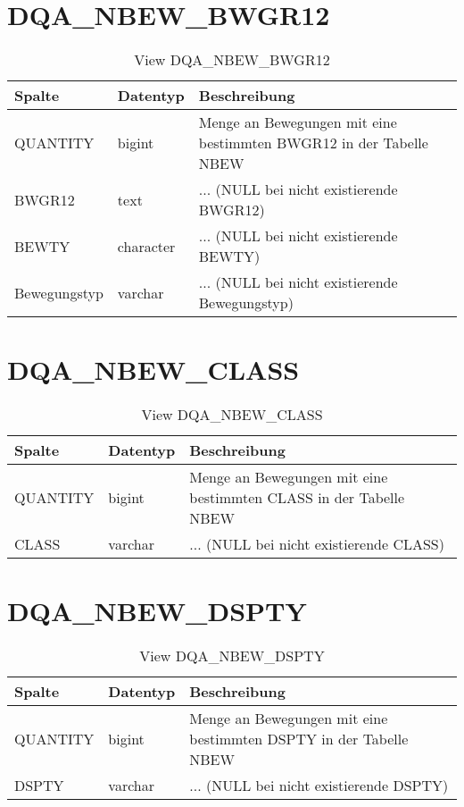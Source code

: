   \section{DQA\_NBEW\_BWGR12}

  \begin{table}[ht]
    \centering
    \caption{View DQA\_NBEW\_BWGR12}
    \label{tab:dqanbewbwgr12}
    \begin{tabular}{||l|l|p{10cm}||}
      \hline
      Spalte & Datentyp & Beschreibung \\ [0.5ex] \hline \hline
QUANTITY & bigint & Menge an Bewegungen mit eine bestimmten BWGR12 in der Tabelle NBEW \\ \hline
BWGR12 & text & ... (NULL bei nicht existierende BWGR12)\\ \hline
BEWTY & character & ... (NULL bei nicht existierende BEWTY)\\ \hline
Bewegungstyp & varchar & ... (NULL bei nicht existierende Bewegungstyp)\\ \hline
    \end{tabular}
  \end{table}
 \clearpage
  \section{DQA\_NBEW\_CLASS}

  \begin{table}[ht]
    \centering
    \caption{View DQA\_NBEW\_CLASS}
    \label{tab:dqanbewclass}
    \begin{tabular}{||l|l|p{10cm}||}
      \hline
      Spalte & Datentyp & Beschreibung \\ [0.5ex] \hline \hline
QUANTITY & bigint & Menge an Bewegungen mit eine bestimmten CLASS in der Tabelle NBEW \\ \hline
CLASS & varchar & ... (NULL bei nicht existierende CLASS)\\ \hline
    \end{tabular}
  \end{table}
 \clearpage
  \section{DQA\_NBEW\_DSPTY}

  \begin{table}[ht]
    \centering
    \caption{View DQA\_NBEW\_DSPTY}
    \label{tab:dqanbewdspty}
    \begin{tabular}{||l|l|p{10cm}||}
      \hline
      Spalte & Datentyp & Beschreibung \\ [0.5ex] \hline \hline
QUANTITY & bigint & Menge an Bewegungen mit eine bestimmten DSPTY in der Tabelle NBEW \\ \hline
DSPTY & varchar & ... (NULL bei nicht existierende DSPTY)\\ \hline
    \end{tabular}
  \end{table}
 \clearpage
